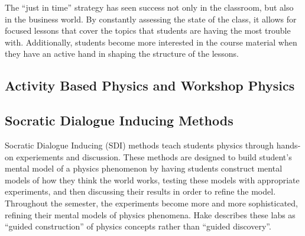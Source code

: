 The ``just in time'' strategy has seen success not only in the classroom, but also in the business world. By constantly assessing the state of the class, it allows for focused lessons that cover the topics that students are having the most trouble with. Additionally, students become more interested in the course material when they have an active hand in shaping the structure of the lessons.

\subsection{Activity Based Physics and Workshop Physics}

%
%
%
%
%
%
%

\subsection{Socratic Dialogue Inducing Methods}

Socratic Dialogue Inducing (SDI) methods teach students physics through hands-on experiements and discussion. These methods are designed to build student's mental model of a physics phenomenon by having students construct mental models of how they think the world works, testing these models with appropriate experiments, and then discussing their results in order to refine the model. Throughout the semester, the experiments become more and more sophisticated, refining their mental models of physics phenomena. Hake describes these labs as ``guided construction'' of physics concepts rather than ``guided discovery''\cite{hake1992}.

